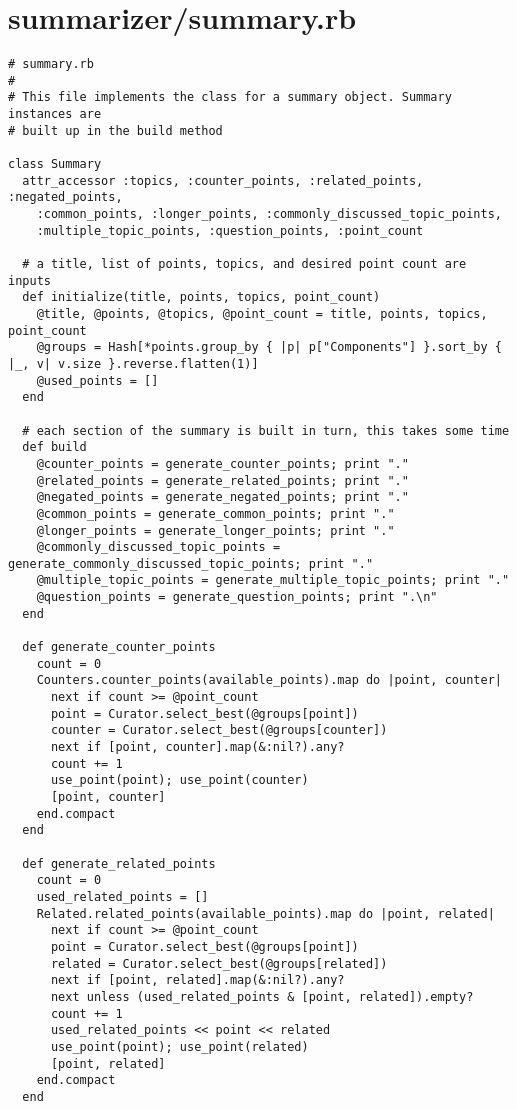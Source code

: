 \documentclass{article}
\begin{document}
\section*{summarizer/summary.rb}
\begin{verbatim}
# summary.rb
#
# This file implements the class for a summary object. Summary instances are
# built up in the build method

class Summary
  attr_accessor :topics, :counter_points, :related_points, :negated_points,
    :common_points, :longer_points, :commonly_discussed_topic_points,
    :multiple_topic_points, :question_points, :point_count

  # a title, list of points, topics, and desired point count are inputs
  def initialize(title, points, topics, point_count)
    @title, @points, @topics, @point_count = title, points, topics, point_count
    @groups = Hash[*points.group_by { |p| p["Components"] }.sort_by { |_, v| v.size }.reverse.flatten(1)]
    @used_points = []
  end

  # each section of the summary is built in turn, this takes some time
  def build
    @counter_points = generate_counter_points; print "."
    @related_points = generate_related_points; print "."
    @negated_points = generate_negated_points; print "."
    @common_points = generate_common_points; print "."
    @longer_points = generate_longer_points; print "."
    @commonly_discussed_topic_points = generate_commonly_discussed_topic_points; print "."
    @multiple_topic_points = generate_multiple_topic_points; print "."
    @question_points = generate_question_points; print ".\n"
  end

  def generate_counter_points
    count = 0
    Counters.counter_points(available_points).map do |point, counter|
      next if count >= @point_count
      point = Curator.select_best(@groups[point])
      counter = Curator.select_best(@groups[counter])
      next if [point, counter].map(&:nil?).any?
      count += 1
      use_point(point); use_point(counter)
      [point, counter]
    end.compact
  end

  def generate_related_points
    count = 0
    used_related_points = []
    Related.related_points(available_points).map do |point, related|
      next if count >= @point_count
      point = Curator.select_best(@groups[point])
      related = Curator.select_best(@groups[related])
      next if [point, related].map(&:nil?).any?
      next unless (used_related_points & [point, related]).empty?
      count += 1
      used_related_points << point << related
      use_point(point); use_point(related)
      [point, related]
    end.compact
  end


\end{verbatim}
\end{document}
